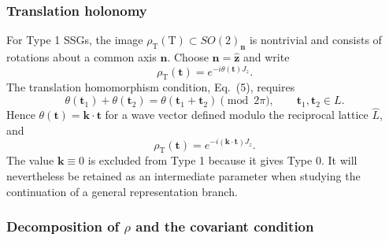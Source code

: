 \subsubsection{Translation holonomy}

For Type 1 SSGs, the image $\rho_{\mathrm T}(\mathrm T)\subset
SO(2)_{\bm n}$ is nontrivial and consists of rotations about a common
axis $\bm n$. Choose $\bm n=\hat{\bm z}$ and write
\begin{equation}
 \rho_{\mathrm T}(\bm t)=e^{-i\theta(\bm t)J_z}.
 \tag{13}\label{algmerge:axialtranslation}
\end{equation}
The translation homomorphism condition, Eq.~(5), requires
\begin{equation}
 \theta(\bm t_1)+\theta(\bm t_2)=\theta(\bm t_1+\bm t_2)
 \pmod{2\pi},\qquad \bm t_1,\bm t_2\in L.
 \tag{14}\label{algmerge:additive}
\end{equation}
Hence $\theta(\bm t)=\bm k\cdot\bm t$ for a wave vector defined
modulo the reciprocal lattice $\widehat L$, and
\begin{equation}
 \rho_{\mathrm T}(\bm t)=e^{-i(\bm k\cdot\bm t)J_z}.
 \tag{15}\label{algmerge:wavevector}
\end{equation}
The value $\bm k\equiv0$ is excluded from Type 1 because it gives
Type 0. It will nevertheless be retained as an intermediate parameter
when studying the continuation of a general representation branch.

\subsubsection{Decomposition of \texorpdfstring{$\rho$}{rho} and the covariant condition}

